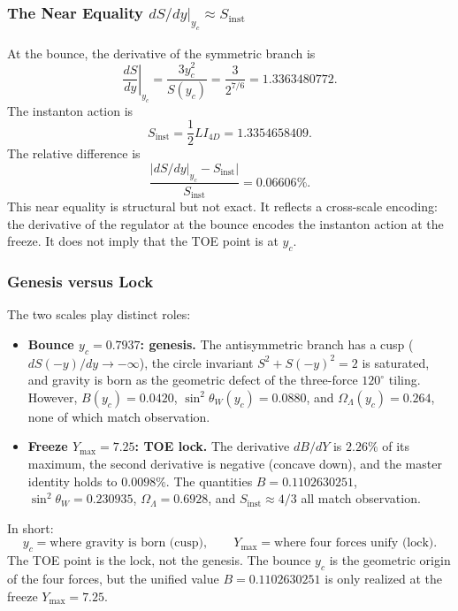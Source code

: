 \documentclass[12pt,oneside,openany]{book}
\begin{document}
\subsubsection{The Near Equality $dS/dy|_{y_c} \approx S_{\mathrm{inst}}$}

At the bounce, the derivative of the symmetric branch is
\begin{equation}
\left.\frac{dS}{dy}\right|_{y_c} = \frac{3y_c^2}{S(y_c)} = \frac{3}{2^{7/6}} = 1.3363480772.
\label{eq:dSdy-yc}
\end{equation}
The instanton action is
\begin{equation}
S_{\mathrm{inst}} = \frac{1}{2}LI_{4D} = 1.3354658409.
\label{eq:Sinst-value}
\end{equation}
The relative difference is
\begin{equation}
\frac{|dS/dy|_{y_c} - S_{\mathrm{inst}}|}{S_{\mathrm{inst}}} = 0.06606\%.
\label{eq:near-eq-error}
\end{equation}
This near equality is structural but not exact. It reflects a cross-scale encoding: the derivative of the regulator at the bounce encodes the instanton action at the freeze. It does not imply that the TOE point is at $y_c$.

\subsubsection{Genesis versus Lock}

The two scales play distinct roles:
\begin{itemize}
\item \textbf{Bounce $y_c = 0.7937$: genesis.} The antisymmetric branch has a cusp ($dS(-y)/dy \to -\infty$), the circle invariant $S^2 + S(-y)^2 = 2$ is saturated, and gravity is born as the geometric defect of the three-force $120^\circ$ tiling. However, $B(y_c) = 0.0420$, $\sin^2\theta_W(y_c) = 0.0880$, and $\Omega_\Lambda(y_c) = 0.264$, none of which match observation.
\item \textbf{Freeze $Y_{\max} = 7.25$: TOE lock.} The derivative $dB/dY$ is $2.26\%$ of its maximum, the second derivative is negative (concave down), and the master identity holds to $0.0098\%$. The quantities $B = 0.1102630251$, $\sin^2\theta_W = 0.230935$, $\Omega_\Lambda = 0.6928$, and $S_{\mathrm{inst}} \approx 4/3$ all match observation.
\end{itemize}
In short:
\begin{equation}
\boxed{y_c = \text{where gravity is born (cusp)}, \qquad Y_{\max} = \text{where four forces unify (lock)}.}
\label{eq:genesis-lock}
\end{equation}
The TOE point is the lock, not the genesis. The bounce $y_c$ is the geometric origin of the four forces, but the unified value $B = 0.1102630251$ is only realized at the freeze $Y_{\max} = 7.25$.
\end{document}
